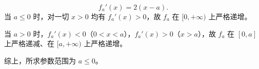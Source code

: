 \[
f_a'(x)=2(x-a).
\]
当 $a\le0$ 时，对一切 $x>0$ 均有 $f_a'(x)>0$，故 $f_a$ 在 $[0,+\infty)$ 上严格递增。

当 $a>0$ 时，$f_a'(x)<0$（$0<x<a$），$f_a'(x)>0$（$x>a$），故 $f_a$ 在 $[0,a]$ 上严格递减、在 $[a,+\infty)$ 上严格递增。

综上，所求参数范围为 $\boxed{a\le0}$。
